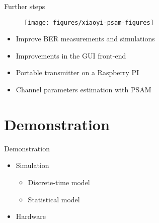 \documentclass[xetex, onlymath, handout]{beamer}
\begin{document}
\begin{frame}{Further steps}
	\begin{figure}
		\centering
		\texttt{[image: figures/xiaoyi-psam-figures]}
	\end{figure}
	\begin{itemize}
		\item Improve BER measurements and simulations
		\item Improvements in the GUI front-end
		\item Portable transmitter on a Raspberry PI
		\item Channel parameters estimation with PSAM
	\end{itemize}
\end{frame}

\section{Demonstration}

\begin{frame}{Demonstration}
		\begin{itemize}
			\item Simulation
				\begin{itemize}
					\item Discrete-time model
					\item Statistical model
				\end{itemize}
			\item Hardware
		\end{itemize}
\end{frame}

\end{document}
